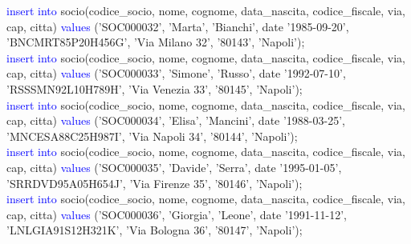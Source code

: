 \documentclass{article}
\begin{document}
\begin{flushleft}
{        \hspace*{0.5em}\textcolor{blue}{insert into} socio(codice\_socio, nome, cognome, data\_nascita, codice\_fiscale, via, \hspace*{0.5em}cap, citta) \textcolor{blue}{values} ('SOC000032', 'Marta', 'Bianchi', date '1985-09-20', \hspace*{0.4em}'BNCMRT85P20H456G', 'Via Milano 32', '80143', 'Napoli'); \\
        \vspace{2mm}
        \hspace*{0.5em}\textcolor{blue}{insert into} socio(codice\_socio, nome, cognome, data\_nascita, codice\_fiscale, via, \hspace*{0.5em}cap, citta) \textcolor{blue}{values} ('SOC000033', 'Simone', 'Russo', date '1992-07-10', \hspace*{0.4em}'RSSSMN92L10H789H', 'Via Venezia 33', '80145', 'Napoli'); \\
        \vspace{2mm}
        \hspace*{0.5em}\textcolor{blue}{insert into} socio(codice\_socio, nome, cognome, data\_nascita, codice\_fiscale, via, \hspace*{0.5em}cap, citta) \textcolor{blue}{values} ('SOC000034', 'Elisa', 'Mancini', date '1988-03-25', \hspace*{0.4em}'MNCESA88C25H987I', 'Via Napoli 34', '80144', 'Napoli'); \\
        \vspace{2mm}
        \hspace*{0.5em}\textcolor{blue}{insert into} socio(codice\_socio, nome, cognome, data\_nascita, codice\_fiscale, via, \hspace*{0.5em}cap, citta) \textcolor{blue}{values} ('SOC000035', 'Davide', 'Serra', date '1995-01-05', \hspace*{0.4em}'SRRDVD95A05H654J', 'Via Firenze 35', '80146', 'Napoli'); \\
        \vspace{2mm}
        \hspace*{0.5em}\textcolor{blue}{insert into} socio(codice\_socio, nome, cognome, data\_nascita, codice\_fiscale, via, \hspace*{0.5em}cap, citta) \textcolor{blue}{values} ('SOC000036', 'Giorgia', 'Leone', date '1991-11-12', \hspace*{0.4em}'LNLGIA91S12H321K', 'Via Bologna 36', '80147', 'Napoli'); \\
        \vspace{2mm}
}
\end{flushleft}
\end{document}
